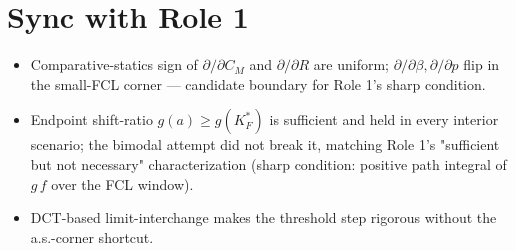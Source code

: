 \documentclass[11pt]{article}
\theoremstyle{remark}
\begin{document}
\section*{Sync with Role 1}
\begin{itemize}
\item Comparative-statics sign of $\partial/\partial C_M$ and
$\partial/\partial R$ are uniform; $\partial/\partial \beta,\partial/
\partial p$ flip in the small-FCL corner --- candidate boundary for Role
1's sharp condition.
\item Endpoint shift-ratio $g(a)\ge g(K_F^*)$ is sufficient and held in
every interior scenario; the bimodal attempt did not break it, matching
Role 1's "sufficient but not necessary" characterization (sharp condition:
positive path integral of $g\,f$ over the FCL window).
\item DCT-based limit-interchange makes the threshold step rigorous
without the a.s.-corner shortcut.
\end{itemize}
\end{document}
